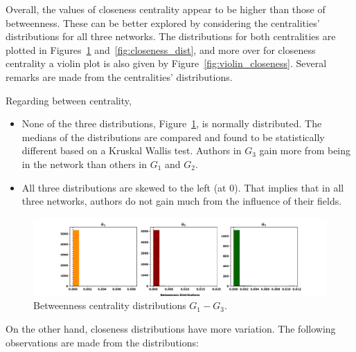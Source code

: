 \documentclass{article}
\theoremstyle{definition}
\begin{document}
Overall, the values of closeness centrality appear to be higher than those of
betweenness. These can be better explored by considering the centralities'
distributions for all three networks. The distributions for both centralities are
plotted in Figures~\ref{fig:betweenness_dist} and~\ref{fig:closeness_dist}, and
more over for closeness centrality a violin plot is also given by Figure~\ref{fig:violin_closeness}.
Several remarks are made from the centralities' distributions.

Regarding between centrality,

\begin{itemize}
    \item None of the three distributions, Figure~\ref{fig:betweenness_dist}, is
    normally distributed. The medians of the distributions are compared and found
    to be statistically different based on a Kruskal Wallis test.
    Authors in \(G_3\) gain more from being in the network than others in \(G_1\)
    and \(G_2\).
    \item All three distributions are skewed to the left (at 0). That implies that
    in all three networks, authors do not gain much from the influence of their
    fields.
\end{itemize}
 
\begin{figure}[!hbtp]
    \centering
    \includegraphics[width=\textwidth]{./assets/images/betweeness_distributions.pdf}
    \caption{Betweenness centrality distributions \(G_1-G_3\).}\label{fig:betweenness_dist}
\end{figure}

On the other hand, closeness distributions have more variation. The following
observations are made from the distributions:
\end{document}

